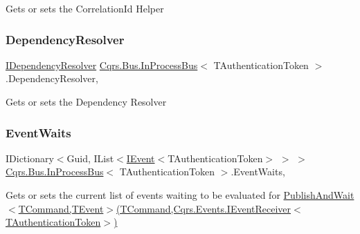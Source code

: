 Gets or sets the Correlation\+Id Helper 

\mbox{\label{classCqrs_1_1Bus_1_1InProcessBus_a2eafea26a2848880fdbf84717b8e60e1}} 
\subsubsection{\texorpdfstring{Dependency\+Resolver}{DependencyResolver}}
{\footnotesize\ttfamily \hyperlink{interfaceCqrs_1_1Configuration_1_1IDependencyResolver}{I\+Dependency\+Resolver} \hyperlink{classCqrs_1_1Bus_1_1InProcessBus}{Cqrs.\+Bus.\+In\+Process\+Bus}$<$ T\+Authentication\+Token $>$.Dependency\+Resolver\hspace{0.3cm}{\ttfamily [get]}, {\ttfamily [protected]}}



Gets or sets the Dependency Resolver 

\mbox{\label{classCqrs_1_1Bus_1_1InProcessBus_a84de47f021786b0400e0635ec68b4ec1}} 
\subsubsection{\texorpdfstring{Event\+Waits}{EventWaits}}
{\footnotesize\ttfamily I\+Dictionary$<$Guid, I\+List$<$\hyperlink{interfaceCqrs_1_1Events_1_1IEvent}{I\+Event}$<$T\+Authentication\+Token$>$ $>$ $>$ \hyperlink{classCqrs_1_1Bus_1_1InProcessBus}{Cqrs.\+Bus.\+In\+Process\+Bus}$<$ T\+Authentication\+Token $>$.Event\+Waits\hspace{0.3cm}{\ttfamily [get]}, {\ttfamily [protected]}}



Gets or sets the current list of events waiting to be evaluated for \hyperlink{classCqrs_1_1Bus_1_1InProcessBus_a38c0684e313f42bfb36b40703db94ccb}{Publish\+And\+Wait$<$\+T\+Command,\+T\+Event$>$(\+T\+Command,\+Cqrs.\+Events.\+I\+Event\+Receiver$<$\+T\+Authentication\+Token$>$)} 


